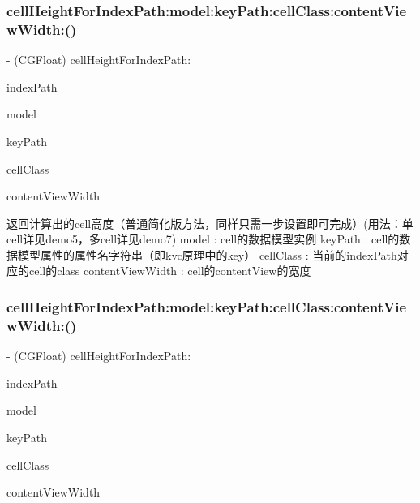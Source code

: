 \subsubsection{\texorpdfstring{cell\+Height\+For\+Index\+Path\+:model\+:key\+Path\+:cell\+Class\+:content\+View\+Width\+:()}{cellHeightForIndexPath:model:keyPath:cellClass:contentViewWidth:()}\hspace{0.1cm}{\footnotesize\ttfamily [2/3]}}
{\footnotesize\ttfamily -\/ (C\+G\+Float) cell\+Height\+For\+Index\+Path\+: \begin{DoxyParamCaption}\item[{(N\+S\+Index\+Path $\ast$)}]{index\+Path }\item[{model:(id)}]{model }\item[{keyPath:(N\+S\+String $\ast$)}]{key\+Path }\item[{cellClass:(Class)}]{cell\+Class }\item[{contentViewWidth:(C\+G\+Float)}]{content\+View\+Width }\end{DoxyParamCaption}}

返回计算出的cell高度（普通简化版方法，同样只需一步设置即可完成）(用法：单cell详见demo5，多cell详见demo7) model \+: cell的数据模型实例 key\+Path \+: cell的数据模型属性的属性名字符串（即kvc原理中的key） cell\+Class \+: 当前的index\+Path对应的cell的class content\+View\+Width \+: cell的content\+View的宽度 \mbox{\label{category_u_i_table_view_07_s_d_auto_table_view_cell_height_08_aeaabd563f7ad3122b11e67a873a076ec}} 
\subsubsection{\texorpdfstring{cell\+Height\+For\+Index\+Path\+:model\+:key\+Path\+:cell\+Class\+:content\+View\+Width\+:()}{cellHeightForIndexPath:model:keyPath:cellClass:contentViewWidth:()}\hspace{0.1cm}{\footnotesize\ttfamily [3/3]}}
{\footnotesize\ttfamily -\/ (C\+G\+Float) cell\+Height\+For\+Index\+Path\+: \begin{DoxyParamCaption}\item[{(N\+S\+Index\+Path $\ast$)}]{index\+Path }\item[{model:(id)}]{model }\item[{keyPath:(N\+S\+String $\ast$)}]{key\+Path }\item[{cellClass:(Class)}]{cell\+Class }\item[{contentViewWidth:(C\+G\+Float)}]{content\+View\+Width }\end{DoxyParamCaption}}

